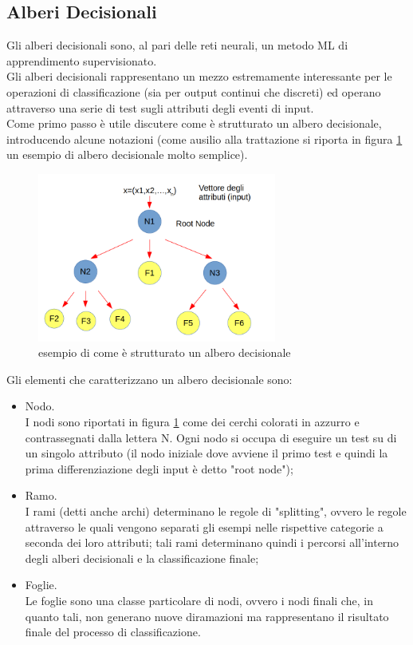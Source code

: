\subsection{Alberi Decisionali}
\label{alberi decisionali}
Gli alberi decisionali sono, al pari delle reti neurali, un metodo ML di apprendimento supervisionato.\\
Gli alberi decisionali rappresentano un mezzo estremamente interessante per le operazioni di classificazione (sia per output continui che discreti) ed operano attraverso una serie di test sugli attributi degli eventi di input. \\ 
Come primo passo è utile discutere come è strutturato un albero decisionale, introducendo alcune notazioni (come ausilio alla trattazione si riporta in figura \ref{schemaDT} un esempio di albero decisionale molto semplice). \\

\begin{figure} [h!]
	\centering
	\includegraphics[width=0.70\textwidth]{figs/schemaDT.png}
	\caption{esempio di come è strutturato un albero decisionale}
	\label{schemaDT}
\end{figure} 

Gli elementi che caratterizzano un albero decisionale sono:
\begin{itemize}
	\item Nodo. \\
	I nodi sono riportati in figura \ref{schemaDT} come dei cerchi colorati in azzurro e contrassegnati dalla lettera N. Ogni nodo si occupa di eseguire un test su di un singolo attributo (il nodo iniziale dove avviene il primo test e quindi la prima differenziazione degli input è detto "root node");
	\item Ramo. \\
	I rami (detti anche archi) determinano le regole di "splitting", ovvero le regole attraverso le quali vengono separati gli esempi nelle rispettive categorie a seconda dei loro attributi; tali rami determinano quindi i percorsi all'interno degli alberi decisionali e la classificazione finale;
	\item Foglie. \\
	Le foglie sono una classe particolare di nodi, ovvero i nodi finali che, in quanto tali, non generano nuove diramazioni ma rappresentano il risultato finale del processo di classificazione.
\end{itemize}

